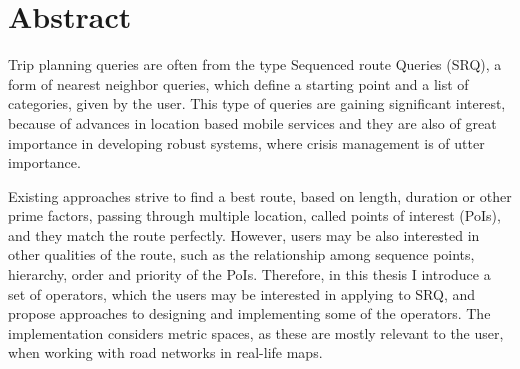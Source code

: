 \chapter{Abstract}

Trip planning queries are often from the type Sequenced route Queries (SRQ), a form of nearest neighbor queries, which define a starting point and a list of categories, given by the user. This type of queries are gaining significant interest, because of advances in location based mobile services and they are also of great importance in developing robust systems, where crisis management is of utter importance. \newline

Existing approaches strive to find a best route, based on length, duration or other prime factors, passing through multiple location, called points of interest (PoIs), and they match the route perfectly. However, users may be also interested in other qualities of the route, such as the relationship among sequence points, hierarchy, order and priority of the PoIs. Therefore, in this thesis  I introduce a set of operators, which the users may be interested in applying to SRQ, and propose approaches to designing and implementing some of the operators. The implementation considers metric spaces, as these are mostly relevant to the user, when working with road networks in real-life maps.

